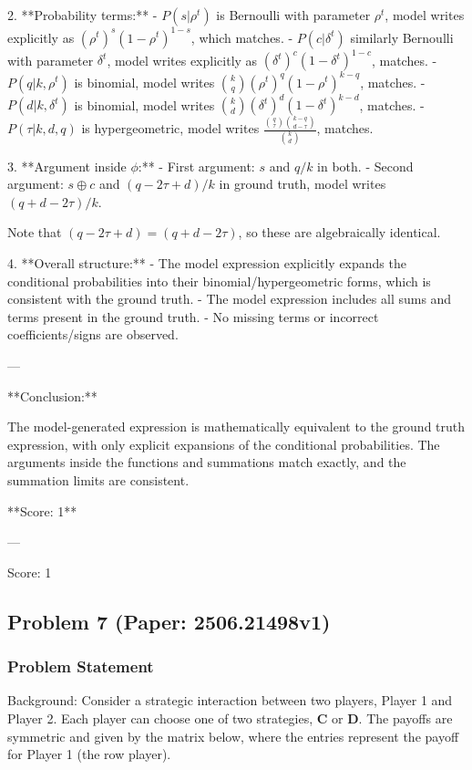 \documentclass[10pt]{article}
\begin{document}
2. **Probability terms:**
   - $P(s|\rho^t)$ is Bernoulli with parameter $\rho^t$, model writes explicitly as $(\rho^t)^s (1-\rho^t)^{1-s}$, which matches.
   - $P(c|\delta^t)$ similarly Bernoulli with parameter $\delta^t$, model writes explicitly as $(\delta^t)^c (1-\delta^t)^{1-c}$, matches.
   - $P(q|k,\rho^t)$ is binomial, model writes $\binom{k}{q} (\rho^t)^q (1-\rho^t)^{k-q}$, matches.
   - $P(d|k,\delta^t)$ is binomial, model writes $\binom{k}{d} (\delta^t)^d (1-\delta^t)^{k-d}$, matches.
   - $P(\tau|k,d,q)$ is hypergeometric, model writes $\frac{\binom{q}{\tau} \binom{k-q}{d-\tau}}{\binom{k}{d}}$, matches.

3. **Argument inside $\phi$:**
   - First argument: $s$ and $q/k$ in both.
   - Second argument: $s \oplus c$ and $(q - 2\tau + d)/k$ in ground truth, model writes $(q + d - 2\tau)/k$.
   
   Note that $(q - 2\tau + d) = (q + d - 2\tau)$, so these are algebraically identical.

4. **Overall structure:**
   - The model expression explicitly expands the conditional probabilities into their binomial/hypergeometric forms, which is consistent with the ground truth.
   - The model expression includes all sums and terms present in the ground truth.
   - No missing terms or incorrect coefficients/signs are observed.

---

**Conclusion:**

The model-generated expression is mathematically equivalent to the ground truth expression, with only explicit expansions of the conditional probabilities. The arguments inside the functions and summations match exactly, and the summation limits are consistent.

**Score: 1**

---

Score: 1

\newpage
\subsection*{Problem 7 (Paper: 2506.21498v1)}
\subsubsection*{Problem Statement}
Background:
Consider a strategic interaction between two players, Player 1 and Player 2. Each player can choose one of two strategies, $\mathbf{C}$ or $\mathbf{D}$. The payoffs are symmetric and given by the matrix below, where the entries represent the payoff for Player 1 (the row player).
\end{document}
